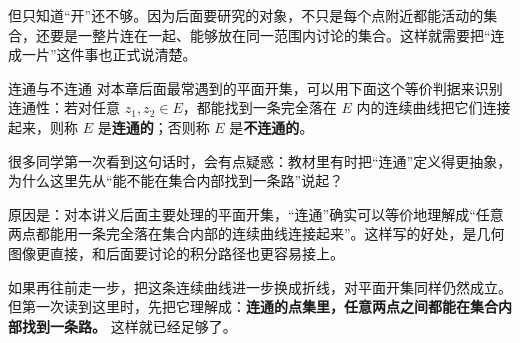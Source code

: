 \noindent 但只知道``开''还不够。因为后面要研究的对象，不只是每个点附近都能活动的集合，还要是一整片连在一起、能够放在同一范围内讨论的集合。这样就需要把``连成一片''这件事也正式说清楚。

\begin{dingliyi}{连通与不连通}{}
对本章后面最常遇到的平面开集，可以用下面这个等价判据来识别连通性：若对任意 $z_1,z_2\in E$，都能找到一条完全落在 $E$ 内的连续曲线把它们连接起来，则称 $E$ 是\textbf{连通的}；否则称 $E$ 是\textbf{不连通的}。
\end{dingliyi}

\begin{tishi}
很多同学第一次看到这句话时，会有点疑惑：教材里有时把``连通''定义得更抽象，为什么这里先从``能不能在集合内部找到一条路''说起？

原因是：对本讲义后面主要处理的平面开集，``连通''确实可以等价地理解成``任意两点都能用一条完全落在集合内部的连续曲线连接起来''。这样写的好处，是几何图像更直接，和后面要讨论的积分路径也更容易接上。

如果再往前走一步，把这条连续曲线进一步换成折线，对平面开集同样仍然成立。但第一次读到这里时，先把它理解成：\textbf{连通的点集里，任意两点之间都能在集合内部找到一条路。} 这样就已经足够了。
\end{tishi}

